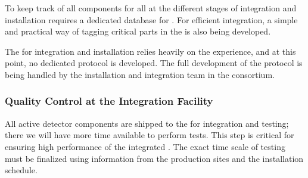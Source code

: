 To keep track of all components for all  at the different stages of  integration and installation requires a dedicated database for . For efficient integration, a simple and practical way of tagging critical parts in the  is also being developed.

The  for integration and installation relies heavily on the  experience, and at this point, no dedicated  protocol is developed. The full development of the protocol is being handled by the installation and integration team in the  consortium. 

\subsubsection{Quality Control at the Integration Facility}
\label{sec:fdsp-apa-install-qc_if}

All active detector components are shipped to the  for integration and testing; there we will have more time available %
to perform tests. This step is critical for ensuring high performance of the integrated . The exact time scale of  testing must be finalized using information from the production sites and the installation schedule. 



\begin{comment}
\begin{dunetable}[QC List]{l|c|c}{tab:qclist}{List of tests performed for Quality Control upon reception at the integration facility}   
Test to perform   &  Number of wires/channels & Acceptable values, action\\ 
Visual inspection & All & > 99\% intact \\
Wire tension      & 10$\%$ sample & 5 $\pm$ \SI{1}{N}\\
Wire continuity   & All & $-$\\
Current leakage   & All & < X $\mu$A \\
Electronics connections & All & Perfect (> 99$\%$)\\
Cold test         & All & All intact (> 99$\%$)\\
\textbf{Overall}  & \textbf{All} & \textbf{At least 99$\%$ fully operational}\\
\end{dunetable}
\end{comment}

